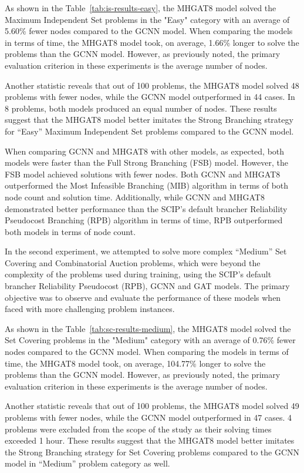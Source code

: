 


As shown in the Table~\ref{tab:is-results-easy}, the MHGAT8 model solved the Maximum Independent Set problems in the "Easy" category with an average of 5.60\% fewer nodes compared to the GCNN model.
When comparing the models in terms of time, the MHGAT8 model took, on average, 1.66\% longer to solve the problems than the GCNN model.
However, as previously noted, the primary evaluation criterion in these experiments is the average number of nodes.


Another statistic reveals that out of 100 problems, the MHGAT8 model solved 48 problems with fewer nodes, while the GCNN model outperformed in 44 cases.
In 8 problems, both models produced an equal number of nodes.
These results suggest that the MHGAT8 model better imitates the Strong Branching strategy for “Easy” Maximum Independent Set problems compared to the GCNN model.


When comparing GCNN and MHGAT8 with other models, as expected, both models were faster than the Full Strong Branching (FSB) model.
However, the FSB model achieved solutions with fewer nodes.
Both GCNN and MHGAT8 outperformed the Most Infeasible Branching (MIB) algorithm in terms of both node count and solution time.
Additionally, while GCNN and MHGAT8 demonstrated better performance than the SCIP’s default brancher Reliability Pseudocost Branching (RPB) algorithm in terms of time, RPB outperformed both models in terms of node count.




In the second experiment, we attempted to solve more complex “Medium” Set Covering and Combinatorial Auction problems, which were beyond the complexity of the problems used during training, using the SCIP’s default brancher Reliability Pseudocost (RPB), GCNN and GAT models.
The primary objective was to observe and evaluate the performance of these models when faced with more challenging problem instances.


As shown in the Table~\ref{tab:sc-results-medium}, the MHGAT8 model solved the Set Covering problems in the "Medium" category with an average of 0.76\% fewer nodes compared to the GCNN model.
When comparing the models in terms of time, the MHGAT8 model took, on average, 104.77\% longer to solve the problems than the GCNN model.
However, as previously noted, the primary evaluation criterion in these experiments is the average number of nodes.


Another statistic reveals that out of 100 problems, the MHGAT8 model solved 49 problems with fewer nodes, while the GCNN model outperformed in 47 cases.
4 problems were excluded from the scope of the study as their solving times exceeded 1 hour.
These results suggest that the MHGAT8 model better imitates the Strong Branching strategy for Set Covering problems compared to the GCNN model in “Medium” problem category as well.


